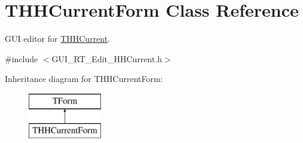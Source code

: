 \hypertarget{class_t_h_h_current_form}{\section{T\+H\+H\+Current\+Form Class Reference}
\label{class_t_h_h_current_form}
}


G\+U\+I editor for \hyperlink{class_t_h_h_current}{T\+H\+H\+Current}.  




{\ttfamily \#include $<$G\+U\+I\+\_\+\+R\+T\+\_\+\+Edit\+\_\+\+H\+H\+Current.\+h$>$}

Inheritance diagram for T\+H\+H\+Current\+Form\+:\begin{figure}[H]
\begin{center}
\leavevmode
\includegraphics[height=2.000000cm]{class_t_h_h_current_form}
\end{center}
\end{figure}
